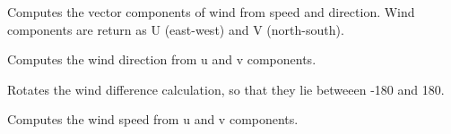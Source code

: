 \documentclass[letterpaper,10pt,english]{sphinxmanual}
\begin{document}

\begin{fulllineitems}
\label{\detokenize{index:profiler_metr.wind_components}}
Computes the vector components of wind from speed and direction.
Wind components are return as U (east-west) and V (north-south).

\end{fulllineitems}


\begin{fulllineitems}
\label{\detokenize{index:profiler_metr.wind_direction}}
Computes the wind direction from u and v components.

\end{fulllineitems}


\begin{fulllineitems}
\label{\detokenize{index:profiler_metr.wind_direction_difference}}
Rotates the wind difference calculation,
so that they lie betweeen -180 and 180.

\end{fulllineitems}


\begin{fulllineitems}
\label{\detokenize{index:profiler_metr.wind_speed}}
Computes the wind speed from u and v components.

\end{fulllineitems}
\end{document}
